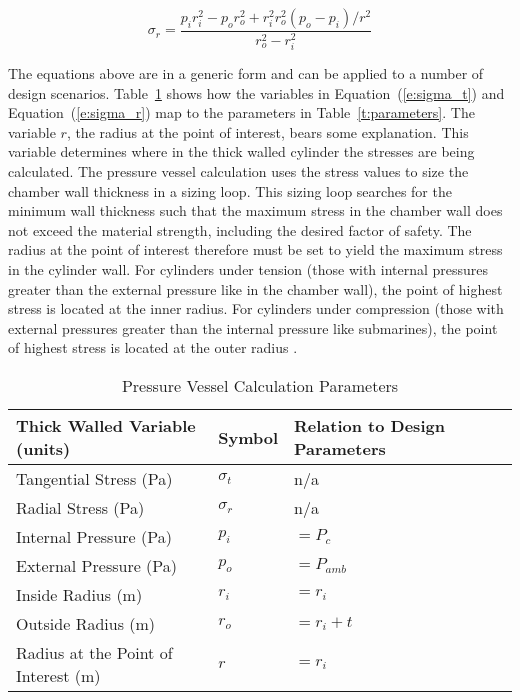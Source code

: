 \documentclass{article}
\begin{document}
\begin{equation}
 \label{e:sigma_r}
  \sigma_r = \frac{p_i r_i^2 - p_o r_o^2 + r_i^2 r_o^2 (p_o - p_i)/r^2}{r_o^2 - r_i^2}
\end{equation}

The equations above are in a generic form and can be applied to a number of design scenarios.  Table~\ref{t:parameter_mapping} shows how the variables in Equation~(\ref{e:sigma_t}) and Equation~(\ref{e:sigma_r}) map to the parameters in Table~\ref{t:parameters}.  The variable $r$, the radius at the point of interest, bears some explanation.  This variable determines where in the thick walled cylinder the stresses are being calculated.  The pressure vessel calculation uses the stress values to size the chamber wall thickness in a sizing loop.  This  sizing loop searches for the minimum wall thickness such that the maximum stress in the chamber wall does not exceed the material strength, including the desired factor of safety.  The radius at the point of interest therefore must be set to yield the maximum stress in the cylinder wall.  For cylinders under tension (those with internal pressures greater than the external pressure like in the chamber wall), the point of highest stress is located at the inner radius.  For cylinders under compression (those with external pressures greater than the internal pressure like submarines), the point of highest stress is located at the outer radius \cite{Kharagpur2015}. 

\begin{table}[ht!]%
  \caption{Pressure Vessel Calculation Parameters}
  \centering
  \begin{tabular}{llll}
   Thick Walled Variable (units) & Symbol & Relation to Design Parameters \\
	\hline\hline
	Tangential Stress (Pa) & $\sigma_t$ & n/a \\
	Radial Stress (Pa) & $\sigma_r$  & n/a \\
	Internal Pressure (Pa) & $p_i$ & $= P_c$\\
	External Pressure (Pa) & $p_o$ & $= P_{amb}$\\
	Inside Radius (m) & $r_i$ & $= r_i$\\
	Outside Radius (m) & $r_o$ & $= r_i + t$\\
	Radius at the Point of Interest (m) & $r$ & $= r_i$\\
	\hline
  \end{tabular}
 \label{t:parameter_mapping}
\end{table}
\end{document}
